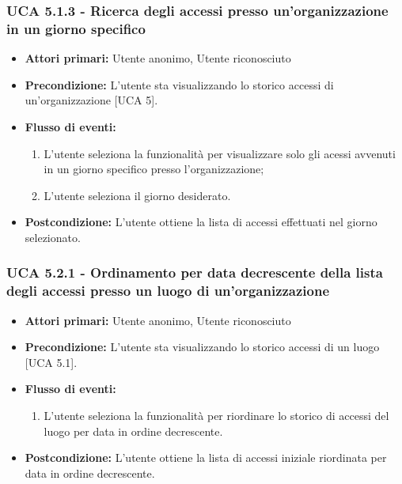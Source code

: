 \subsubsection{UCA 5.1.3 - Ricerca degli accessi presso un'organizzazione in un giorno specifico}
\begin{itemize}
    \item \textbf{Attori primari:} Utente anonimo, Utente riconosciuto
    \item \textbf{Precondizione:} L'utente sta visualizzando lo storico accessi di un'organizzazione [UCA 5].
    \item \textbf{Flusso di eventi:}
    \begin{enumerate}
        \item L'utente seleziona la funzionalità per visualizzare solo gli acessi avvenuti in un giorno specifico presso l'organizzazione;
        \item L'utente seleziona il giorno desiderato.
    \end{enumerate}
    \item \textbf{Postcondizione:} L'utente ottiene la lista di accessi effettuati nel giorno selezionato.
\end{itemize}

\subsubsection{UCA 5.2.1 - Ordinamento per data decrescente della lista degli accessi presso un luogo di un'organizzazione}
\begin{itemize}
    \item \textbf{Attori primari:} Utente anonimo, Utente riconosciuto
    \item \textbf{Precondizione:} L'utente sta visualizzando lo storico accessi di un luogo [UCA 5.1].
    \item \textbf{Flusso di eventi:}
    \begin{enumerate}
        \item L'utente seleziona la funzionalità per riordinare lo storico di accessi del luogo per data in ordine decrescente.
    \end{enumerate}
    \item \textbf{Postcondizione:} L'utente ottiene la lista di accessi iniziale riordinata per data in ordine decrescente.
\end{itemize}


